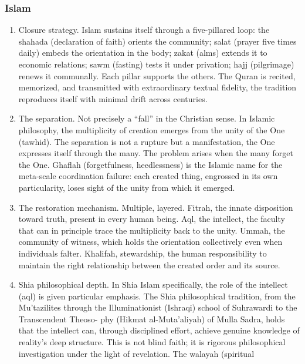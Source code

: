 \documentclass[
]{article}
\begin{document}
\subsubsection{Islam}\label{islam}

\begin{enumerate}
\def\labelenumi{\arabic{enumi}.}
\setcounter{enumi}{28}
\item
  Closure strategy. Islam sustains itself through a five-pillared loop:
  the shahada (declaration of faith) orients the community; salat
  (prayer five times daily) embeds the orientation in the body; zakat
  (alms) extends it to economic relations; sawm (fasting) tests it under
  privation; hajj (pilgrimage) renews it communally. Each pillar
  supports the others. The Quran is recited, memorized, and transmitted
  with extraordinary textual fidelity, the tradition reproduces itself
  with minimal drift across centuries.
\item
  The separation. Not precisely a ``fall'' in the Christian sense. In
  Islamic philosophy, the multiplicity of creation emerges from the
  unity of the One (tawhid). The separation is not a rupture but a
  manifestation, the One expresses itself through the many. The problem
  arises when the many forget the One. Ghaflah (forgetfulness,
  heedlessness) is the Islamic name for the meta-scale coordination
  failure: each created thing, engrossed in its own particularity, loses
  sight of the unity from which it emerged.
\item
  The restoration mechanism. Multiple, layered. Fitrah, the innate
  disposition toward truth, present in every human being. Aql, the
  intellect, the faculty that can in principle trace the multiplicity
  back to the unity. Ummah, the community of witness, which holds the
  orientation collectively even when individuals falter. Khalifah,
  stewardship, the human responsibility to maintain the right
  relationship between the created order and its source.
\item
  Shia philosophical depth. In Shia Islam specifically, the role of the
  intellect (aql) is given particular emphasis. The Shia philosophical
  tradition, from the Mu'tazilites through the Illuminationist (Ishraqi)
  school of Suhrawardi to the Transcendent Theoso- phy (Hikmat
  al-Muta'aliyah) of Mulla Sadra, holds that the intellect can, through
  disciplined effort, achieve genuine knowledge of reality's deep
  structure. This is not blind faith; it is rigorous philosophical
  investigation under the light of revelation. The walayah (spiritual

\end{enumerate}
\end{document}
